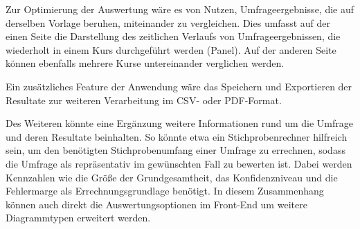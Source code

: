 Zur Optimierung der Auswertung wäre es von Nutzen, Umfrageergebnisse, die auf derselben Vorlage beruhen, miteinander zu vergleichen.
Dies umfasst auf der einen Seite die Darstellung des zeitlichen Verlaufs von Umfrageergebnissen, die wiederholt in einem Kurs durchgeführt werden (Panel).
Auf der anderen Seite können ebenfalls mehrere Kurse untereinander verglichen werden.

Ein zusätzliches Feature der Anwendung wäre das Speichern und Exportieren der Resultate zur weiteren Verarbeitung im \acs{CSV}- oder \acs{PDF}-Format.

Des Weiteren könnte eine Ergänzung weitere Informationen rund um die Umfrage und deren Resultate beinhalten.
So könnte etwa ein Stichprobenrechner hilfreich sein, um den benötigten Stichprobenumfang einer Umfrage zu errechnen, sodass die Umfrage als repräsentativ im gewünschten Fall zu bewerten ist.
Dabei werden Kennzahlen wie die Größe der Grundgesamtheit, das Konfidenzniveau und die Fehlermarge als Errechnungsgrundlage benötigt.
In diesem Zusammenhang können auch direkt die Auswertungsoptionen im Front-End um weitere Diagrammtypen erweitert werden.
